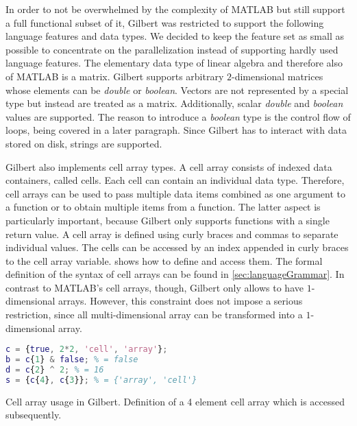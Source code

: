 In order to not be overwhelmed by the complexity of MATLAB but still support a full functional subset of it, Gilbert was restricted to support the following language features and data types.
We decided to keep the feature set as small as possible to concentrate on the parallelization instead of supporting hardly used language features.
The elementary data type of linear algebra and therefore also of MATLAB is a matrix.
Gilbert supports arbitrary $2$-dimensional matrices whose elements can be \emph{double} or \emph{boolean}.
Vectors are not represented by a special type but instead are treated as a matrix.
Additionally, scalar \emph{double} and \emph{boolean} values are supported.
The reason to introduce a \emph{boolean} type is the control flow of loops, being covered in a later paragraph.
Since Gilbert has to interact with data stored on disk, strings are supported.

Gilbert also implements cell array types.
A cell array consists of indexed data containers, called cells.
Each cell can contain an individual data type.
Therefore, cell arrays can be used to pass multiple data items combined as one argument to a function or to obtain multiple items from a function.
The latter aspect is particularly important, because Gilbert only supports functions with a single return value.
A cell array is defined using curly braces and commas to separate individual values.
The cells can be accessed by an index appended in curly braces to the cell array variable.
 shows how to define and access them.
The formal definition of the syntax of cell arrays can be found in \cref{sec:languageGrammar}.
In contrast to MATLAB's cell arrays, though, Gilbert only allows to have $1$-dimensional arrays.
However, this constraint does not impose a serious restriction, since all multi-dimensional array can be transformed into a $1$-dimensional array. 

\begin{listing}[!h]
	\begin{CenteredBox}
		\begin{lstlisting}[language=Matlab,
  			commentstyle=\color{black},
  			stringstyle=\color{black},
		]
c = {true, 2*2, 'cell', 'array'};
b = c{1} & false; % = false
d = c{2} ^ 2; % = 16
s = {c{4}, c{3}}; % = {'array', 'cell'} 
		\end{lstlisting}
	\end{CenteredBox}
	\caption{Cell array usage in Gilbert. Definition of a 4 element cell array which is accessed subsequently.}
	\label{lst:cellArray}
\end{listing}

